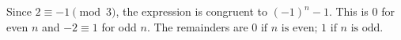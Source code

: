 Since $2\equiv-1\pmod3$, the expression is congruent to $(-1)^n-1$. This is 0 for even $n$ and $-2\equiv1$ for odd $n$. The remainders are $\boxed{0\text{ if }n\text{ is even; }1\text{ if }n\text{ is odd}}$.
